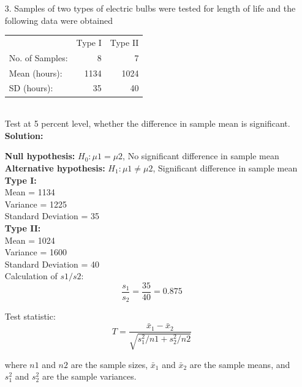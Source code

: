 \documentclass[a4paper,11pt,openright]{report}
\begin{document}
\begin{enumerate}
\item[3.] Samples of two types of electric bulbs were tested for length of life and the
following data were obtained \\
\begin{tabular}{lrr}
		& Type I & Type II \\
No. of Samples: & 8 & 7 \\
Mean (hours):   & 1134 & 1024 \\
SD (hours):     & 35 & 40 \\
\end{tabular} \\
Test at 5 percent level, whether the difference in sample mean is significant. \\

\textbf{Solution:}

\textbf{Null hypothesis:} $H_{0}: \mu 1 = \mu 2$, No significant difference in sample mean
\\
\textbf{Alternative hypothesis:} $H_{1}: \mu 1 \neq \mu 2$, Significant difference in sample
mean \\

\textbf{Type I:} \\
\hspace*{10mm} Mean = 1134 \\
\hspace*{10mm} Variance = 1225 \\
\hspace*{10mm} Standard Deviation = 35 \\

\textbf{Type II:} \\
\hspace*{10mm} Mean = 1024 \\
\hspace*{10mm} Variance = 1600 \\
\hspace*{10mm} Standard Deviation = 40 \\

Calculation of $s1/s2$:
\begin{equation*}
\frac{s_{1}}{s_{2}} = \frac{35}{40} = 0.875
\end{equation*}

Test statistic: 
\begin{equation*}
T = \frac{\bar x_{1} - \bar x_{2}}{\sqrt{s_{1}^{2}/n1 + s_{2}^{2}/n2}}
\end{equation*}

where $n1$ and $n2$ are the sample sizes, $\bar x_{1}$ and $\bar x_{2}$ are the sample
means, and $s_{1}^{2}$ and $s_{2}^{2}$ are the sample variances. 


\end{enumerate}
\end{document}
